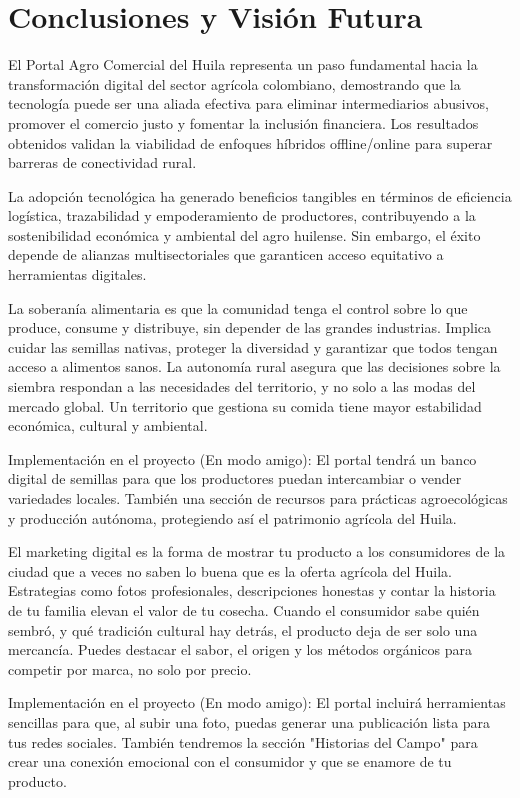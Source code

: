 \section{Conclusiones y Visión Futura}

El Portal Agro Comercial del Huila representa un paso fundamental hacia la transformación digital del sector agrícola colombiano, demostrando que la tecnología puede ser una aliada efectiva para eliminar intermediarios abusivos, promover el comercio justo y fomentar la inclusión financiera. Los resultados obtenidos validan la viabilidad de enfoques híbridos offline/online para superar barreras de conectividad rural.

La adopción tecnológica ha generado beneficios tangibles en términos de eficiencia logística, trazabilidad y empoderamiento de productores, contribuyendo a la sostenibilidad económica y ambiental del agro huilense. Sin embargo, el éxito depende de alianzas multisectoriales que garanticen acceso equitativo a herramientas digitales.

La soberanía alimentaria es que la comunidad tenga el control sobre lo que produce, consume y distribuye, sin depender de las grandes industrias. Implica cuidar las semillas nativas, proteger la diversidad y garantizar que todos tengan acceso a alimentos sanos. La autonomía rural asegura que las decisiones sobre la siembra respondan a las necesidades del territorio, y no solo a las modas del mercado global. Un territorio que gestiona su comida tiene mayor estabilidad económica, cultural y ambiental.

Implementación en el proyecto (En modo amigo): El portal tendrá un banco digital de semillas para que los productores puedan intercambiar o vender variedades locales. También una sección de recursos para prácticas agroecológicas y producción autónoma, protegiendo así el patrimonio agrícola del Huila.

El marketing digital es la forma de mostrar tu producto a los consumidores de la ciudad que a veces no saben lo buena que es la oferta agrícola del Huila. Estrategias como fotos profesionales, descripciones honestas y contar la historia de tu familia elevan el valor de tu cosecha. Cuando el consumidor sabe quién sembró, y qué tradición cultural hay detrás, el producto deja de ser solo una mercancía. Puedes destacar el sabor, el origen y los métodos orgánicos para competir por marca, no solo por precio.

Implementación en el proyecto (En modo amigo): El portal incluirá herramientas sencillas para que, al subir una foto, puedas generar una publicación lista para tus redes sociales. También tendremos la sección "Historias del Campo" para crear una conexión emocional con el consumidor y que se enamore de tu producto.

